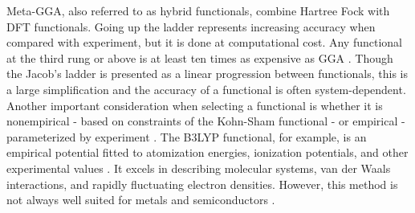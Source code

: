 \documentclass[3p,review,12pt]{elsarticle}
\begin{document}
Meta-GGA, also referred to as hybrid functionals, combine Hartree Fock with DFT functionals. Going up the ladder represents increasing accuracy when compared with experiment, but it is done at computational cost. Any functional at the third rung or above is at least ten times as expensive as GGA \cite{Lee2012}. Though the Jacob's ladder is presented as a linear progression between functionals, this is a large simplification and the accuracy of a functional is often system-dependent. Another important consideration when selecting a functional is whether it is nonempirical - based on constraints of the Kohn-Sham functional - or empirical - parameterized by experiment \cite{Sholl2009}. The B3LYP functional, for example, is an empirical potential fitted to atomization energies, ionization potentials, and other experimental values \cite{Lee2012}. It excels in describing molecular systems, van der Waals interactions, and rapidly fluctuating electron densities. However, this method is not always well suited for metals and semiconductors \cite{Paier2007}.
\end{document}
